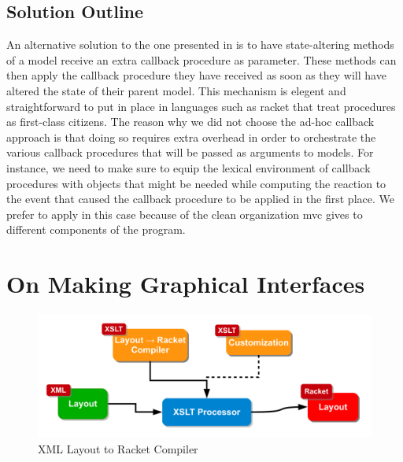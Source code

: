 \documentclass[10pt,oneside,a4paper]{skh-scrreprt}
\begin{document}
\section{Solution Outline}


An alternative solution
to the one presented in
is to have state-altering
methods of a model
receive an extra callback
procedure as parameter.
These methods can then
apply the callback
procedure they have received
as soon as they will have
altered the state of
their parent model.
This mechanism is
elegent and
straightforward to 
put in place in languages
such as \gls{racket}
that treat procedures
as first-class citizens.
The reason why we
did not choose the
ad-hoc callback approach 
is that doing so requires
extra overhead in order to
orchestrate the various
callback procedures
that will be passed
as arguments to models.
For instance,
we need to make sure
to equip the lexical
environment of callback
procedures with objects
that might be needed
while computing the reaction
to the event that caused the
callback procedure to be applied
in the first place.
We prefer to apply 
in this case because of the clean
organization \gls{mvc} gives
to different components of
the program.

\chapter{On Making Graphical Interfaces}\label{chap:gui}





\begin{figure}[h]\label{fig:layout-to-racket}
\caption{XML Layout to Racket Compiler}
\includegraphics[width=14cm]{fig/layout-to-racket}
\end{figure}
\end{document}
